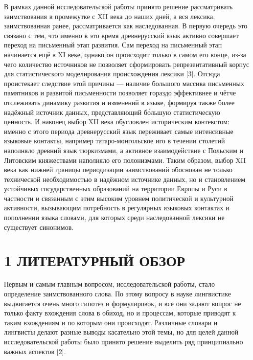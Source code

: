 В рамках данной исследовательской работы принято решение рассматривать заимствования в промежутке с XII века до наших дней, а вся лексика, заимствованная ранее, рассматривается как наследованная. В первую очередь это связано с тем, что именно в это время древнерусский язык активно совершает переход на письменный этап развития. Сам переход на письменный этап начинается ещё в XI веке, однако он происходит только в самом его конце, из-за чего количество источников не позволяет сформировать репрезентативный корпус для статистического моделирования происхождения лексики {[}3{]}. Отсюда проистекает следствие этой причины --- наличие большого массива письменных памятников и развитой письменности позволяет гораздо эффективнее и чётче отслеживать динамику развития и изменений в языке, формируя также более надёжный источник данных, представляющий бо́льшую статистическую ценность. И наконец выбор XII века обусловлен историческим контекстом: именно с этого периода древнерусский язык переживает самые интенсивные языковые контакты, например татаро-монгольское иго в течении столетий наполняло древний язык тюркизмами, а активное взаимодействие с Польским и Литовским княжествами наполняло его полонизмами. Таким образом, выбор XII века как нижней границы периодизации заимствований обоснован не только технической необходимостью в надёжном источнике данных, но и становлением устойчивых государственных образований на территории Европы и Руси в частности и связанным с этим высоким уровнем политической и культурной активности, вызывающим потребность в регулярных языковых контактах и пополнении языка словами, для которых среди наследованной лексики не существует синонимов.

\section{1 ЛИТЕРАТУРНЫЙ ОБЗОР}\label{ux43bux438ux442ux435ux440ux430ux442ux443ux440ux43dux44bux439-ux43eux431ux437ux43eux440}

Первым и самым главным вопросом, исследовательской работы, стало определение заимствованного слова. По этому вопросу в науке лингвистике выдвигается очень много гипотез и формулировок, и все они задают вопрос не только факту вхождения слова в обиход, но и процессам, которые приводят к таким вхождениям и по которым они происходят. Различные словари и лингвисты делают разные выводы касательно этой темы, но для целей данной исследовательской работы было принято решение выделить ряд принципиально важных аспектов {[}2{]}.

